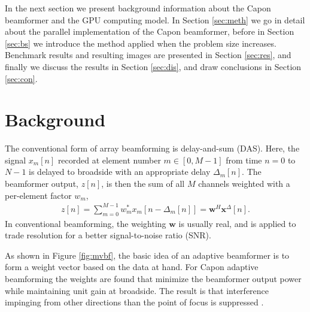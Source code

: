 \documentclass[journal]{IEEEtran}
\renewcommand{\vec}[1]{\mathbf{#1}}
\begin{document}
In the next section we present background information about the Capon beamformer and the GPU computing model. In Section \ref{sec:meth} we go in detail about the parallel implementation of the Capon beamformer, before in Section \ref{sec:bs} we introduce the method applied when the problem size increases. Benchmark results and resulting images are presented in Section \ref{sec:res}, and finally we discuss the results in Section \ref{sec:dis}, and draw conclusions in Section \ref{sec:con}. 

\section{Background}







The conventional form of array beamforming is delay-and-sum (DAS). Here, the signal $x_m[n]$ recorded at element number $m \in [0,M-1]$ from time $n = 0$ to $N-1$ is delayed to broadside with an appropriate delay $\Delta_m[n]$. The beamformer output, $z[n]$, is then the sum of all $M$ channels weighted with a per-element factor $w_m$,
\begin{align}
z[n] = \sum_{m = 0}^{M-1}w_m^*x_m[n - \Delta_m[n]] = \vec{w}^H\vec{x}^{\Delta}[n]. \label{eq:z}
\end{align}
In conventional beamforming, the weighting $\vec{w}$ is usually real, and is applied to trade resolution for a better signal-to-noise ratio (SNR).

As shown in Figure \ref{fig:mvbf}, the basic idea of an adaptive beamformer is to form a weight vector based on the data at hand.  For Capon adaptive beamforming the weights are found that minimize the beamformer output power while maintaining unit gain at broadside. The result is that interference impinging from other directions than the point of focus is suppressed \cite{Synnevag2007}.
\end{document}
